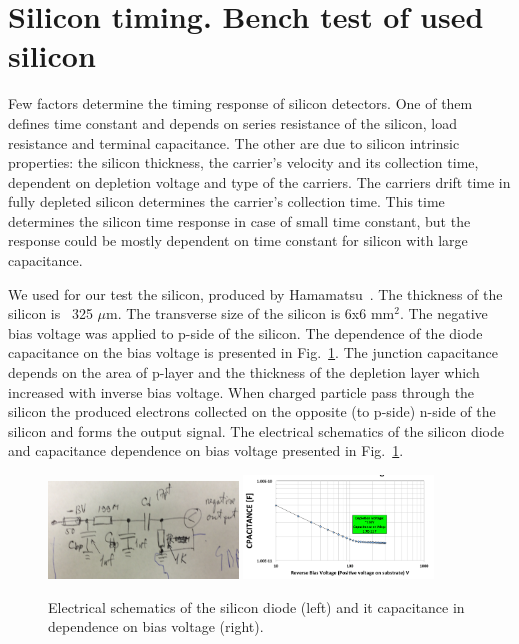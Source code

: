 \documentclass[12pt]{article}
\begin{document}
\section{Silicon timing. Bench test of used silicon}
\label{sec:siliconpad}

Few factors determine the timing response of silicon detectors. One of them
defines time constant and depends on series resistance of the silicon, load
resistance and terminal capacitance. The other are due to silicon intrinsic
properties: the silicon thickness, the carrier’s velocity and its collection
time, dependent on depletion voltage and type of the carriers. The carriers
drift time in fully depleted silicon determines the carrier’s collection time.
This time determines the silicon time response in case of small time constant,
but the response could be mostly dependent on time constant for silicon with
large capacitance.

We used for our test the silicon, produced by Hamamatsu~\cite{hamamatsu}. The
thickness of the silicon is ~325 $\mu$m. The transverse size of the silicon is
6x6 mm$^2$. The negative bias voltage was applied to p-side of the silicon. The
dependence of the diode capacitance on the bias voltage is presented in
Fig.~\ref{fig:SiliconDiode}. The junction capacitance depends on the area of
p-layer and the thickness of the depletion layer which increased with inverse
bias voltage. When charged particle pass through the silicon the produced
electrons collected on the opposite (to p-side) n-side of the silicon and forms
the output signal. The electrical schematics of the silicon diode and
capacitance dependence on bias voltage presented in Fig.~\ref{fig:SiliconDiode}.

\begin{figure}[htbp] 
\centering
\includegraphics[width=0.45\textwidth]{plots/SiliconDiodeDiagram.png} 
\includegraphics[width=0.45\textwidth]{plots/SiliconDiodeCV.png} 
\caption{Electrical schematics of the silicon diode (left) and it capacitance in dependence on bias voltage (right). } 
\label{fig:SiliconDiode} 
\end{figure} 
\end{document}
